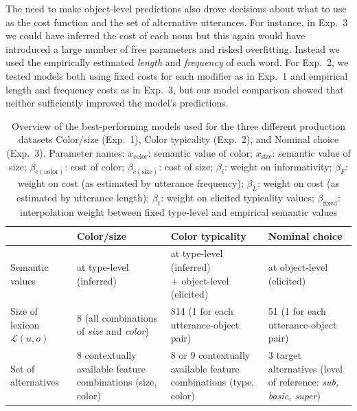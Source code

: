 \documentclass[11pt]{article}
\begin{document}
The need to make object-level predictions also drove decisions about what to use as the cost function and the set of alternative utterances.
For instance, in Exp.~3 we could have inferred the cost of each noun but this again would have introduced a large number of free parameters and risked overfitting. 
Instead we used the empirically estimated \emph{length} and \emph{frequency} of each word. 
For Exp.~2, we tested models both using fixed costs for each modifier as in Exp.~1 and empirical length and frequency costs as in Exp.~3, but our model comparison showed that neither sufficiently improved the model's predictions.

\begin{table}
\caption{Overview of the best-performing models used for the three different production datasets Color/size (Exp.~1), Color typicality (Exp.~2), and Nominal choice (Exp.~3). Parameter names:  $x_{\textrm{color}}$: semantic value of color; $x_{\textrm{size}}$: semantic value of size; $\beta_{c(\textrm{color})}$: cost of color;  $\beta_{c(\textrm{size})}$: cost of size; $\beta_i$: weight on informativity; $\beta_F$: weight on cost (as estimated by utterance frequency); $\beta_L$: weight on cost (as estimated by utterance length); $\beta_t$: weight on elicited typicality values; $\beta_{\textrm{fixed}}$: interpolation weight between fixed type-level and empirical semantic values} 
\begin{tabular}{p{2.5cm} p{4.2cm} p{4.2cm} p{4.2cm} }
\toprule
& Color/size & Color typicality & Nominal choice \\
\midrule
\makecell{Semantic \\ values} & at type-level (inferred) & \makecell{at type-level (inferred) \\ + object-level (elicited)} & at object-level (elicited) \\
\midrule
\makecell{Size of \\lexicon $\mathcal{L}(u,o)$}  & 8 (all combinations of \emph{size} and \emph{color}) & 814 (1 for each utterance-object pair) & 51 (1 for each utterance-object pair)\\
\midrule
\makecell{Set of \\alternatives} & 8 contextually available feature combinations (size, color) & 8 or 9 contextually available feature combinations (type, color) & 3 target alternatives (level of reference: \emph{sub, basic, super}) \\

\end{tabular}
\end{table}
\end{document}
